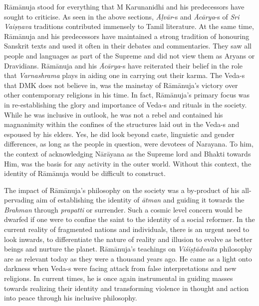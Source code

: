 Rāmānuja stood for everything that M Karunanidhi and his predecessors have sought to criticise. As seen in the above sections, \textit{Āḷvār}-s and \textit{Ācārya}-s of \textit{Sri Vaiṣņava} traditions contributed immensely to Tamil literature. At the same time, Rāmānuja and his predecessors have maintained a strong tradition of honouring Sanskrit texts and used it often in their debates and commentaries. They saw all people and languages as part of the Supreme and did not view them as Aryans or Dravidians. Rāmānuja and his \textit{Ācārya}-s have reiterated their belief in the role that \textit{Varnashrama} plays in aiding one in carrying out their karma. The Veda-s that DMK does not believe in, was the mainstay of Rāmānuja’s victory over other contemporary religions in his time. In fact, Rāmānuja’s primary focus was in re-establishing the glory and importance of Veda-s and rituals in the society. While he was inclusive in outlook, he was not a rebel and contained his magnanimity within the confines of the structures laid out in the Veda-s and espoused by his elders. Yes, he did look beyond caste, linguistic and gender differences, as long as the people in question, were devotees of Narayana. To him, the context of acknowledging Nārāyana as the Supreme lord and Bhakti towards Him, was the basis for any activity in the outer world. Without this context, the identity of Rāmānuja would be difficult to construct.

The impact of Rāmānuja’s philosophy on the society was a by-product of his all-pervading aim of establishing the identity of \textit{ātman} and guiding it towards the \textit{Brahman} through \textit{prapatti }or surrender. Such a cosmic level concern would be dwarfed if one were to confine the saint to the identity of a social reformer. In the current reality of fragmented nations and individuals, there is an urgent need to look inwards, to differentiate the nature of reality and illusion to evolve as better beings and nurture the planet. Rāmānuja’s teachings on \textit{Viśiṣṭādvaita} philosophy are as relevant today as they were a thousand years ago. He came as a light onto darkness when Veda-s were facing attack from false interpretations and new religions. In current times, he is once again instrumental in guiding masses towards realizing their identity and transforming violence in thought and action into peace through his inclusive philosophy.


